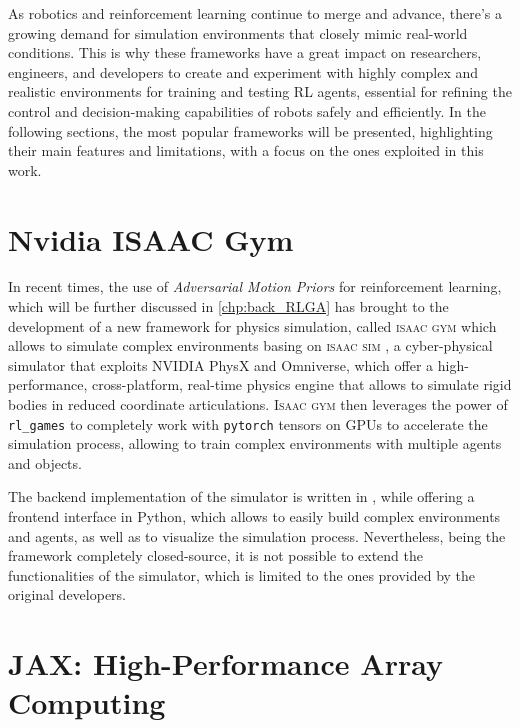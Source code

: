 As robotics and reinforcement learning continue to merge and advance, there's a growing demand for simulation environments that closely mimic real-world conditions. This is why these frameworks have a great impact on researchers, engineers, and developers to create and experiment with highly complex and realistic environments for training and testing \ac{RL} agents, essential for refining the control and decision-making capabilities of robots safely and efficiently. In the following sections, the most popular frameworks will be presented, highlighting their main features and limitations, with a focus on the ones exploited in this work.

\section{Nvidia ISAAC Gym}

In recent times, the use of \textit{Adversarial Motion Priors} \citep{peng_amp_2021} for reinforcement learning, which will be further discussed in \cref{chp:back_RLGA} has brought to the development of a new framework for physics simulation, called \textsc{isaac gym} \citep{makoviychuk_isaac_2021} which allows to simulate complex environments basing on \textsc{isaac sim} \citep{zhou_towards_2023}, a cyber-physical simulator that exploits NVIDIA PhysX and Omniverse, which offer a high-performance, cross-platform, real-time physics engine that allows to simulate rigid bodies in reduced coordinate articulations. \textsc{Isaac gym} then leverages the power of \texttt{rl\_games} \citep{rl-games2021} to completely work with \texttt{pytorch} \citep{paszke_pytorch_2019} tensors on \ac{GPU}s to accelerate the simulation process, allowing to train complex environments with multiple agents and objects.

The backend implementation of the simulator is written in \cpp, while offering a frontend interface in Python, which allows to easily build complex environments and agents, as well as to visualize the simulation process. Nevertheless, being the framework completely closed-source, it is not possible to extend the functionalities of the simulator, which is limited to the ones provided by the original developers.

\section{JAX: High-Performance Array Computing}

